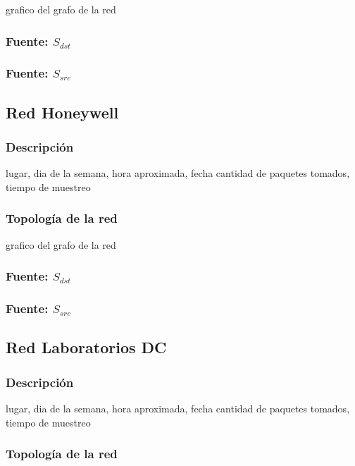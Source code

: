 \documentclass[10pt, a4paper]{article}
\begin{document}
grafico del grafo de la red

\subsubsection{Fuente: $S_{dst}$}

\subsubsection{Fuente: $S_{src}$}

\subsection{Red Honeywell}

\subsubsection{Descripción}

lugar, dia de la semana, hora aproximada, fecha
cantidad de paquetes tomados, tiempo de muestreo

\subsubsection{Topología de la red}

grafico del grafo de la red

\subsubsection{Fuente: $S_{dst}$}

\subsubsection{Fuente: $S_{src}$}

\subsection{Red Laboratorios DC}

\subsubsection{Descripción}

lugar, dia de la semana, hora aproximada, fecha
cantidad de paquetes tomados, tiempo de muestreo

\subsubsection{Topología de la red}
\end{document}
